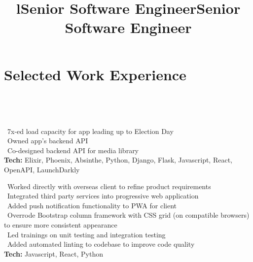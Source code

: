     \section{Selected Work Experience}

        \begin{format}
            \\
            \title{l}\\
            \body
        \end{format}
        
        \title{Senior Software Engineer}
        \begin{position}
			\textbullet \ 7x-ed load capacity for app leading up to Election Day\\
			\textbullet \ Owned app's backend API\\
			\textbullet \ Co-designed backend API for media library\\
			\textbf{Tech:} Elixir, Phoenix, Absinthe, Python, Django, Flask, Javascript, React, OpenAPI, LaunchDarkly
        \end{position}
        
        \title{Senior Software Engineer}
        \begin{position}
			\textbullet \ Worked directly with overseas client to refine product requirements\\
			\textbullet \ Integrated third party services into progressive web application \\
			\textbullet \ Added push notification functionality to PWA for client\\
			\textbullet \ Overrode Bootstrap column framework with CSS grid (on compatible browsers) to ensure more consistent appearance\\
			\textbullet \ Led trainings on unit testing and integration testing\\
			\textbullet \ Added automated linting to codebase to improve code quality\\
			\textbf{Tech:} Javascript, React, Python
        \end{position}
        
